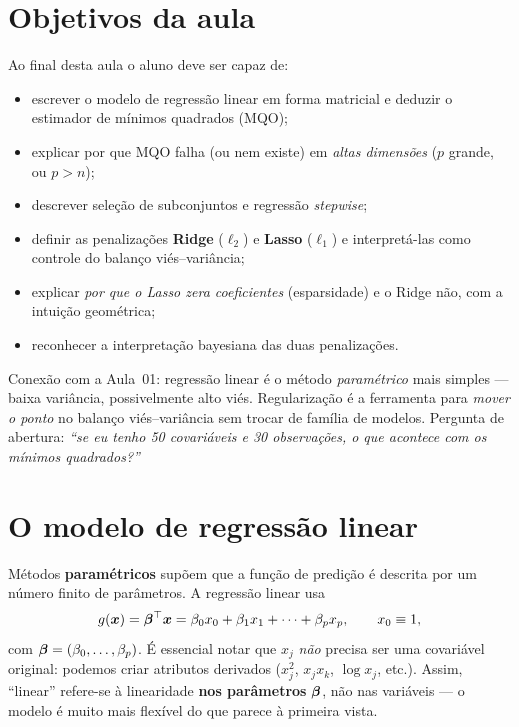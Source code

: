\documentclass[11pt,a4paper]{article}
\begin{document}

\section*{Objetivos da aula}
Ao final desta aula o aluno deve ser capaz de:
\begin{itemize}[leftmargin=1.4cm]
  \item escrever o modelo de regressão linear em forma matricial e deduzir o
        estimador de mínimos quadrados (MQO);
  \item explicar por que MQO falha (ou nem existe) em \emph{altas dimensões}
        ($p$ grande, ou $p>n$);
  \item descrever seleção de subconjuntos e regressão \emph{stepwise};
  \item definir as penalizações \textbf{Ridge} ($\ell_2$) e \textbf{Lasso}
        ($\ell_1$) e interpretá-las como controle do balanço viés--variância;
  \item explicar \emph{por que o Lasso zera coeficientes} (esparsidade) e o Ridge
        não, com a intuição geométrica;
  \item reconhecer a interpretação bayesiana das duas penalizações.
\end{itemize}

\begin{emsala}
Conexão com a Aula~01: regressão linear é o método \emph{paramétrico} mais simples
--- baixa variância, possivelmente alto viés. Regularização é a ferramenta para
\emph{mover o ponto} no balanço viés--variância sem trocar de família de modelos.
Pergunta de abertura: \emph{``se eu tenho 50 covariáveis e 30 observações, o que
acontece com os mínimos quadrados?''}
\end{emsala}

\section{O modelo de regressão linear}
Métodos \textbf{paramétricos} supõem que a função de predição é descrita por um
número finito de parâmetros. A regressão linear usa
\begin{equation}\label{eq:linear}
  g(\bm{x}) = \bm{\beta}^\top \bm{x} = \beta_0 x_0 + \beta_1 x_1 + \dots + \beta_p x_p,
  \qquad x_0 \equiv 1,
\end{equation}
com $\bm{\beta}=(\beta_0,\dots,\beta_p)$. É essencial notar que $x_j$ \emph{não} precisa
ser uma covariável original: podemos criar atributos derivados ($x_j^2$, $x_jx_k$,
$\log x_j$, etc.). Assim, ``linear'' refere-se à linearidade \textbf{nos
parâmetros} $\bm{\beta}$, não nas variáveis --- o modelo é muito mais flexível do que
parece à primeira vista.
\end{document}
